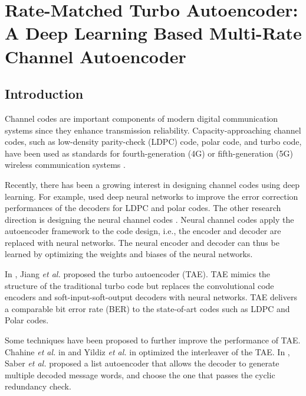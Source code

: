\documentclass [PhD] {uclathes}
\begin{document}
\chapter{Rate-Matched Turbo Autoencoder: A Deep Learning Based Multi-Rate Channel Autoencoder} \label{cpt: cae}

\section{Introduction}
Channel codes  are important components of modern digital communication systems since they enhance transmission reliability. Capacity-approaching channel codes, such as low-density parity-check (LDPC) code\cite{gallager1962low}, polar code\cite{Arikan_polar}, and turbo code\cite{turbo}, have been used as standards for fourth-generation (4G) or fifth-generation (5G) wireless communication systems \cite{3gpp.36.212, 3gpp2017study}.

Recently, there has been a growing interest in designing channel codes using deep learning. For example, \cite{nachimain_ldpc_neural_decoder,wang_n2dnms,polar_neural_decoder} used deep neural networks to improve the error correction performances of the decoders for LDPC and polar codes.
The other research direction is designing the neural channel codes \cite{makkuva2021ko,chahine_tae_interleaver,clausius_strcutre_tae,jamali_productae,jiang_rnn_cae,saber_list_tae,jiang2019turbo,zhang2021design}. Neural channel codes apply the autoencoder framework \cite{vincent2008extracting} to the code design, i.e., the encoder and decoder are replaced with neural networks. The neural encoder and decoder can  thus be learned by optimizing the weights and biases of the neural networks. 

In \cite{jiang2019turbo}, Jiang \emph{et al.} proposed the turbo autoencoder (TAE). TAE mimics the structure of the traditional turbo code but replaces the convolutional code encoders and soft-input-soft-output decoders with neural networks. TAE delivers a comparable bit error rate (BER) to the state-of-art codes such as LDPC and Polar codes. 

Some techniques have been proposed to further improve the performance of TAE. Chahine \emph{et al.} in \cite{chahine_tae_interleaver} and Yildiz \emph{et al.} in \cite{TAE_interleaver} optimized the interleaver of the TAE. In \cite{saber_list_tae}, Saber \emph{et al.} proposed a list autoencoder that allows the decoder to generate multiple decoded message words, and choose the one that passes the cyclic redundancy check. 
\end{document}
